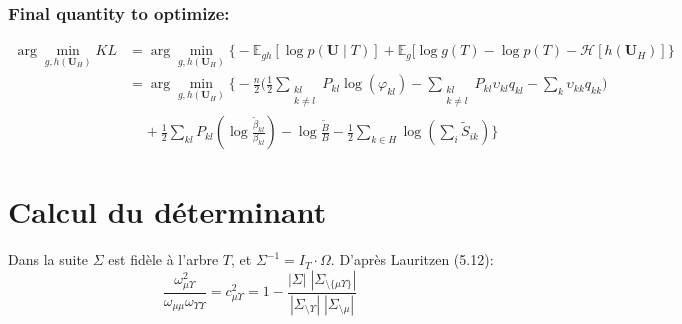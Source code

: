 \documentclass[11pt,a4paper]{article}
\newcommand{\argmin}{\arg\!\min}
\newcommand{\entr}{\mathcal{H}}
\newcommand{\Ubf}{\boldsymbol{U}}
\newcommand{\Esp}{\mathds{E}}
\begin{document}
\subsubsection{Final quantity to optimize:}
\begin{align*}
\argmin_{g,h(\Ubf_H)} KL  &=\argmin_{g,h(\Ubf_H)}  \Big\{-\Esp_{gh}[\log p(\Ubf \mid T) ] + \Esp_g[\log g(T) - \log p(T)-\entr[h(\Ubf_H)]\Big\}\\
&= \argmin_{g,h(\Ubf_H)}  \bigg\{ -\frac{n}{2} \Big(\frac{1}{2}\sum _{\substack{kl\\ k \neq l}} P_{kl} \log (\varphi_{kl}) - \sum_{\substack{kl\\ k \neq l}} P_{kl} \upsilon_{kl} q_{kl} - \sum_{k} \upsilon_{kk} q_{kk}\Big) \\
& \;\;\;\; + \frac{1}{2}\sum_{kl}P_{kl} \left(\log \frac{\widetilde{\beta}_{kl}}{{\beta}_{kl}}\right) - \log \frac{\widetilde{B}}{B} -\frac{1}{2}\sum_{k\in H} \log\left(\sum_i \widetilde{S}_{ik}\right) \bigg\}
\end{align*}
 

\newpage

 \appendix
\section{Calcul du déterminant}
Dans la suite $\Sigma$ est fidèle à l'arbre $T$, et $\Sigma^{-1} = I_T\cdot \Omega$. D'après Lauritzen (5.12):
$$\frac{\omega_{\mu\Upsilon}^2}{\omega_{\mu\mu}\omega_{\Upsilon\Upsilon}} = c_{\mu\Upsilon}^2 = 1-\frac{|\Sigma|\;|\Sigma_{\setminus \{\mu\Upsilon\}}|}{|\Sigma_{\setminus\Upsilon}|\;|\Sigma_{\setminus \mu}|} $$
\end{document}
